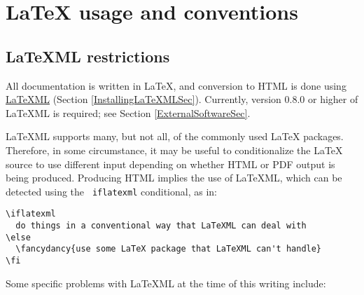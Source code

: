 \documentclass{article}
\begin{document}
\section{LaTeX usage and conventions}

\label{LatexUsage}

\subsection{LaTeXML restrictions}

All documentation is written in LaTeX, and conversion to HTML is done
using \href{http://dlmf.nist.gov/LaTeXML/}{LaTeXML} (Section
\ref{InstallingLaTeXMLSec}).  Currently, version 0.8.0 or higher of
LaTeXML is required; see Section \ref{ExternalSoftwareSec}.

LaTeXML supports many, but not all, of the commonly used LaTeX
packages. Therefore, in some circumstance, it may be useful to
conditionalize the LaTeX source to use different input depending on
whether HTML or PDF output is being produced. Producing HTML implies
the use of LaTeXML, which can be detected using the {\tt \BKS
iflatexml} conditional, as in:

\begin{lstlisting}[]
\iflatexml
  do things in a conventional way that LaTeXML can deal with
\else
  \fancydancy{use some LaTeX package that LaTeXML can't handle}
\fi
\end{lstlisting}

Some specific problems with LaTeXML at the time of this writing
include:
\end{document}
